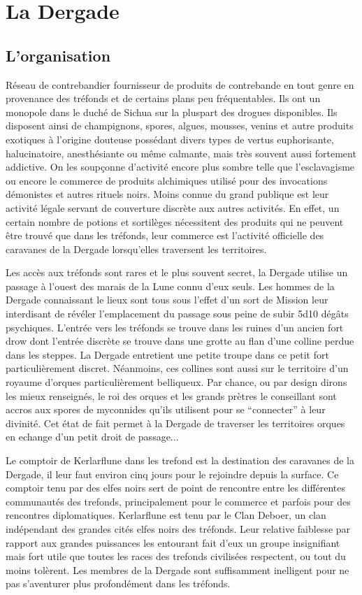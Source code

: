 \section{La Dergade}

\subsection*{L'organisation}

Réseau de contrebandier fournisseur de produits de contrebande en tout genre
en provenance des tréfonds et de certains plans peu fréquentables. Ils ont 
un monopole dans le duché de Sichua sur la pluspart des drogues disponibles. 
Ils disposent ainsi de champignons, spores, algues, mousses, venins et autre 
produits exotiques à l'origine douteuse possédant divers types de vertus 
euphorisante, halucinatoire, anesthésiante ou même calmante, mais très 
souvent aussi fortement addictive. On les soupçonne d'activité encore plus 
sombre telle que l'esclavagisme ou encore le commerce de produits alchimiques 
utilisé pour des invocations démonistes et autres rituels noirs. Moins connue
du grand publique est leur activité légale servant de couverture discrète aux
autres activités. En effet, un certain nombre de potions et sortilèges 
nécessitent des produits qui ne peuvent être trouvé que dans les tréfonds,
leur commerce est l'activité officielle des caravanes de la Dergade 
lorsqu'elles traversent les territoires.

Les accès aux tréfonds sont rares et le plus souvent secret, la Dergade 
utilise un passage à l'ouest des marais de la Lune connu d'eux seuls. Les
hommes de la Dergade connaissant le lieux sont tous sous l'effet d'un sort de
Mission leur interdisant de révéler l'emplacement du passage sous peine de
subir 5d10 dégâts psychiques. L'entrée vers les tréfonds se trouve dans les
ruines d'un ancien fort drow dont l'entrée discrète se trouve dans une grotte
au flan d'une colline perdue dans les steppes. La Dergade entretient une petite
troupe dans ce petit fort particulièrement discret. Néanmoins, ces collines
sont aussi sur le territoire d'un royaume d'orques particulièrement belliqueux.
Par chance, ou par design dirons les mieux renseignés, le roi des orques et
les grands prètres le conseillant sont accros aux spores de myconnides qu'ils
utilisent pour se ``connecter'' à leur divinité. Cet état de fait permet à la
Dergade de traverser les territoires orques en echange d'un petit droit de
passage...

Le comptoir de Kerlarflune dans les trefond est la destination des caravanes 
de la Dergade, il leur faut environ cinq jours pour le rejoindre depuis la 
surface. Ce comptoir tenu par des elfes noirs sert de point de rencontre 
entre les différentes communautés des trefonds, principalement pour le 
commerce et parfois pour des rencontres diplomatiques. Kerlarflune est tenu
par le Clan Deboer, un clan indépendant des grandes cités elfes noirs des 
tréfonds. Leur relative faiblesse par rapport aux grandes puissances les 
entourant fait d'eux un groupe insignifiant mais fort utile que toutes les
races des trefonds civilisées respectent, ou tout du moins tolèrent. Les 
membres de la Dergade sont suffisamment inelligent pour ne pas s'aventurer 
plus profondément dans les tréfonds.

